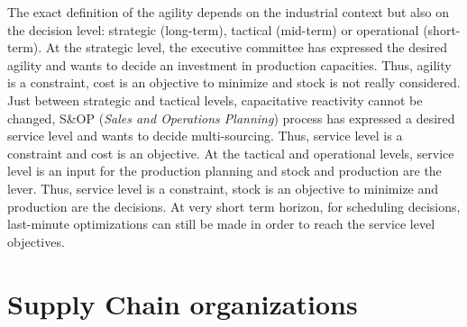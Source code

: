 The exact definition of the agility depends on the industrial context but also on the decision level: strategic (long-term), tactical (mid-term) or operational (short-term).
At the strategic level, the executive committee has expressed the desired agility and wants to decide an investment in production capacities.
Thus, agility is a constraint, cost is an objective to minimize and stock is not really considered.
Just between strategic and tactical levels, capacitative reactivity cannot be changed, S\&OP (\emph{Sales and Operations Planning}) process has expressed a desired service level and wants to decide multi-sourcing.
Thus, service level is a constraint and cost is an objective.
At the tactical and operational levels, service level is an input for the production planning and stock and production are the lever.
Thus, service level is a constraint, stock is an objective to minimize and production are the decisions.
At very short term horizon, \eg for scheduling decisions, last-minute optimizations can still be made in order to reach the service level objectives.


\section{Supply Chain organizations}


